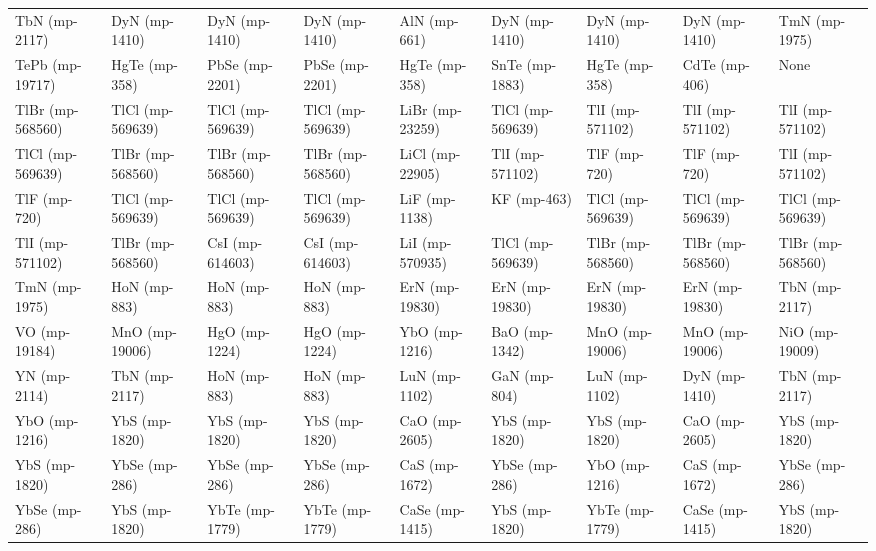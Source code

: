 \begin{longtable}{lllllllll}
    TbN (mp-2117) &     DyN (mp-1410) &       DyN (mp-1410) &     DyN (mp-1410) &        AlN (mp-661) &     DyN (mp-1410) &     DyN (mp-1410) &     DyN (mp-1410) &     TmN (mp-1975) \\
  TePb (mp-19717) &     HgTe (mp-358) &      PbSe (mp-2201) &    PbSe (mp-2201) &       HgTe (mp-358) &    SnTe (mp-1883) &     HgTe (mp-358) &     CdTe (mp-406) &              None \\
 TlBr (mp-568560) &  TlCl (mp-569639) &    TlCl (mp-569639) &  TlCl (mp-569639) &     LiBr (mp-23259) &  TlCl (mp-569639) &   TlI (mp-571102) &   TlI (mp-571102) &   TlI (mp-571102) \\
 TlCl (mp-569639) &  TlBr (mp-568560) &    TlBr (mp-568560) &  TlBr (mp-568560) &     LiCl (mp-22905) &   TlI (mp-571102) &      TlF (mp-720) &      TlF (mp-720) &   TlI (mp-571102) \\
     TlF (mp-720) &  TlCl (mp-569639) &    TlCl (mp-569639) &  TlCl (mp-569639) &       LiF (mp-1138) &       KF (mp-463) &  TlCl (mp-569639) &  TlCl (mp-569639) &  TlCl (mp-569639) \\
  TlI (mp-571102) &  TlBr (mp-568560) &     CsI (mp-614603) &   CsI (mp-614603) &     LiI (mp-570935) &  TlCl (mp-569639) &  TlBr (mp-568560) &  TlBr (mp-568560) &  TlBr (mp-568560) \\
    TmN (mp-1975) &      HoN (mp-883) &        HoN (mp-883) &      HoN (mp-883) &      ErN (mp-19830) &    ErN (mp-19830) &    ErN (mp-19830) &    ErN (mp-19830) &     TbN (mp-2117) \\
    VO (mp-19184) &    MnO (mp-19006) &       HgO (mp-1224) &     HgO (mp-1224) &       YbO (mp-1216) &     BaO (mp-1342) &    MnO (mp-19006) &    MnO (mp-19006) &    NiO (mp-19009) \\
     YN (mp-2114) &     TbN (mp-2117) &        HoN (mp-883) &      HoN (mp-883) &       LuN (mp-1102) &      GaN (mp-804) &     LuN (mp-1102) &     DyN (mp-1410) &     TbN (mp-2117) \\
    YbO (mp-1216) &     YbS (mp-1820) &       YbS (mp-1820) &     YbS (mp-1820) &       CaO (mp-2605) &     YbS (mp-1820) &     YbS (mp-1820) &     CaO (mp-2605) &     YbS (mp-1820) \\
    YbS (mp-1820) &     YbSe (mp-286) &       YbSe (mp-286) &     YbSe (mp-286) &       CaS (mp-1672) &     YbSe (mp-286) &     YbO (mp-1216) &     CaS (mp-1672) &     YbSe (mp-286) \\
    YbSe (mp-286) &     YbS (mp-1820) &      YbTe (mp-1779) &    YbTe (mp-1779) &      CaSe (mp-1415) &     YbS (mp-1820) &    YbTe (mp-1779) &    CaSe (mp-1415) &     YbS (mp-1820) \\

\end{longtable}
